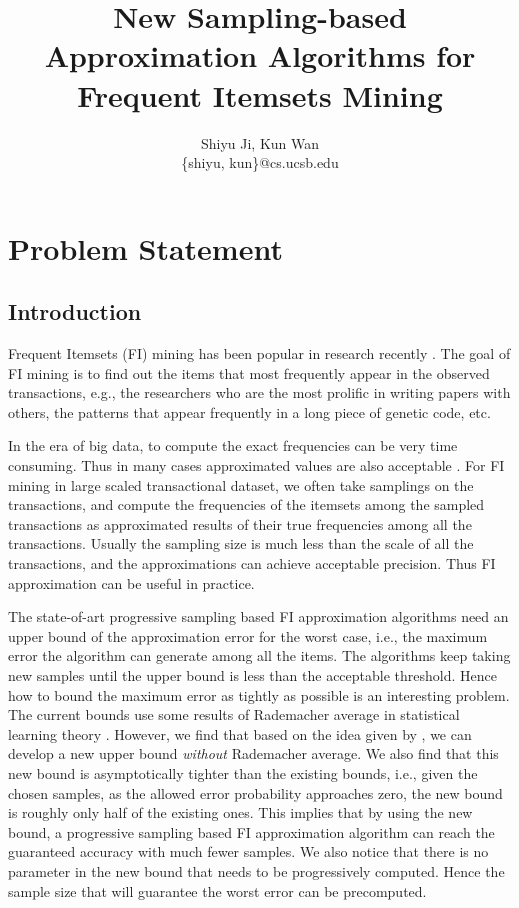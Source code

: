\documentclass{article}
\begin{document}
\title{\Large\bf New Sampling-based Approximation Algorithms for Frequent Itemsets Mining}
\author{Shiyu Ji, Kun Wan\\ \{shiyu, kun\}@cs.ucsb.edu}
\date{}
\maketitle

\newtheorem{definition}{Definition}
\theoremstyle{definition}
\newtheorem{theorem}{Theorem}
\theoremstyle{plain}
\newtheorem{lemma}{Lemma}
\theoremstyle{plain}
\newtheorem{corollary}{Corollary}
\theoremstyle{plain}

\section{Problem Statement}
\subsection{Introduction}
Frequent Itemsets (FI) mining has been popular in research recently \cite{AIS93, HCX07, RU15}. The goal of FI mining is to find out the items that most frequently appear in the observed transactions, e.g., the researchers who are the most prolific in writing papers with others, the patterns that appear frequently in a long piece of genetic code, etc. 

In the era of big data, to compute the exact frequencies can be very time consuming. Thus in many cases approximated values are also acceptable \cite{RU15}.
For FI mining in large scaled transactional dataset, we often take samplings on the transactions, and compute the frequencies of the itemsets among the sampled transactions as approximated results of their true frequencies among all the transactions. Usually the sampling size is much less than the scale of all the transactions, and the approximations can achieve acceptable precision. Thus FI approximation can be useful in practice.

The state-of-art progressive sampling based FI approximation algorithms \cite{RU15} need an upper bound of the approximation error for the worst case, i.e., the maximum error the algorithm can generate among all the items. The algorithms keep taking new samples until the upper bound is less than the acceptable threshold. Hence how to bound the maximum error as tightly as possible is an interesting problem. The current bounds use some results of Rademacher average in statistical learning theory \cite{Vap98,Vap13,BBL04,BBL05}. 
However, we find that based on the idea given by \cite{BBL04}, we can develop a new upper bound \emph{without} Rademacher average. 
We also find that this new bound is asymptotically tighter than the existing bounds, i.e., given the chosen samples, as the allowed error probability approaches zero, the new bound is roughly only half of the existing ones. This implies that by using the new bound, a progressive sampling based FI approximation algorithm can reach the guaranteed accuracy with much fewer samples. We also notice that there is no parameter in the new bound that needs to be progressively computed. Hence the sample size that will guarantee the worst error can be precomputed.
\end{document}
